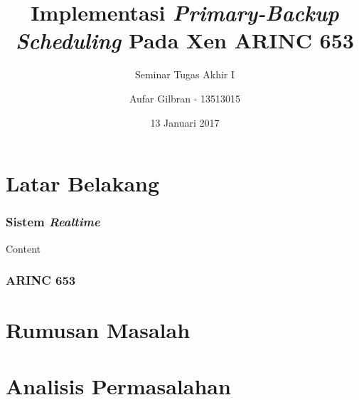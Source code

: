 \documentclass[xetex,mathserif,serif]{beamer}
\title{Implementasi \textit{Primary-Backup Scheduling} Pada Xen ARINC 653}
\subtitle{Seminar Tugas Akhir I}
\author{Aufar Gilbran - 13513015}
\date{13 Januari 2017}
\begin{document}
    \frame{\titlepage}
    \section{Latar Belakang}
    \begin{frame}
        \frametitle{Sistem \textit{Realtime}}
        Content
    \end{frame}
    \begin{frame}
        \frametitle{ARINC 653}
    \end{frame}
    \section{Rumusan Masalah}
    \section{Analisis Permasalahan}
\end{document}
